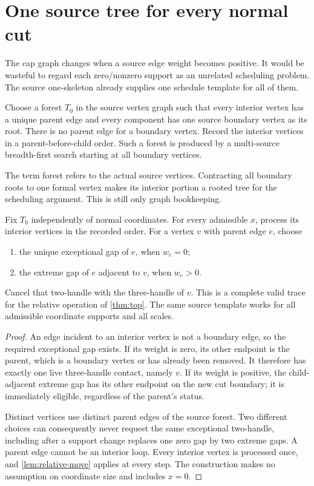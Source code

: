 \section{One source tree for every normal cut}
\label{sec:templates}

The cap graph changes when a source edge weight becomes positive. It would
be wasteful to regard each zero/nonzero support as an unrelated scheduling
problem. The source one-skeleton already supplies one schedule template for
all of them.

\begin{definition}
Choose a forest $T_0$ in the source vertex graph such that every interior
vertex has a unique parent edge and every component has one source boundary
vertex as its root. There is no parent edge for a boundary vertex. Record the
interior vertices in a parent-before-child order. Such a forest is produced
by a multi-source breadth-first search starting at all boundary vertices.
\end{definition}

The term forest refers to the actual source vertices. Contracting all
boundary roots to one formal vertex makes its interior portion a rooted
tree for the scheduling argument. This is still only graph bookkeeping.

\begin{theorem}
\label{thm:template}
Fix $T_0$ independently of normal coordinates. For every admissible $x$,
process its interior vertices in the recorded order. For a vertex $v$ with
parent edge $e$, choose
\begin{enumerate}
\item the unique exceptional gap of $e$, when $w_e=0$;
\item the extreme gap of $e$ adjacent to $v$, when $w_e>0$.
\end{enumerate}
Cancel that two-handle with the three-handle of $v$. This is a complete
valid trace for the relative operation of \cref{thm:top}. The same source
template works for all admissible coordinate supports and all scales.
\end{theorem}

\begin{proof}
An edge incident to an interior vertex is not a boundary edge, so the
required exceptional gap exists. If its weight is zero, its other endpoint
is the parent, which is a boundary vertex or has already been removed. It
therefore has exactly one live three-handle contact, namely $v$. If its
weight is positive, the child-adjacent extreme gap has its other endpoint on
the new cut boundary; it is immediately eligible, regardless of the
parent's status.

Distinct vertices use distinct parent edges of the source forest. Two
different choices can consequently never request the same exceptional
two-handle, including after a support change replaces one zero gap by two
extreme gaps. A parent edge cannot be an interior loop. Every interior
vertex is processed once, and \cref{lem:relative-move} applies at every
step. The construction makes no assumption on coordinate size and includes
$x=0$.
\end{proof}

